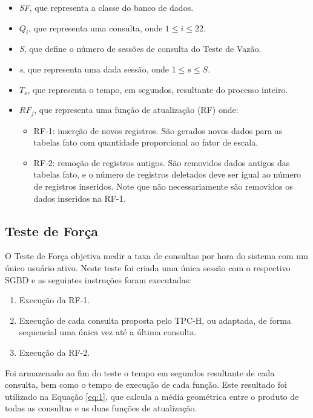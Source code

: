 \documentclass[conference]{IEEEtran}
\begin{document}
\begin{itemize}
	\item \textit{SF}, que representa a classe do banco de dados.
	\item \textit{$Q_{i}$}, que representa uma consulta, onde \mbox{$1 \le i \le 22$}.
	\item \textit{S}, que define o número de sessões de consulta do Teste de Vazão.
	\item \textit{s}, que representa uma dada sessão, onde \mbox{$1 \le s \le S$}.
	\item \textit{$T_{s}$}, que representa o tempo, em segundos, resultante do processo inteiro.
	\item \textit{$RF_{j}$}, que representa uma função de atualização (RF) onde:
		\begin{itemize}
		    \item RF-1: inserção de novos registros. São gerados novos dados para as tabelas fato com quantidade proporcional ao fator de escala. 
		    \item RF-2: remoção de registros antigos. São removidos dados antigos das tabelas fato, e o número de registros deletados deve ser igual ao número de registros inseridos. Note que não necessariamente são removidos os dados inseridos na RF-1.
		\end{itemize}
\end{itemize}

\subsection{Teste de Força}
\label{power_test}
O Teste de Força objetiva medir a taxa de consultas por hora do sistema com um único usuário ativo. Neste teste foi criada uma única sessão com o respectivo SGBD e as seguintes instruções foram executadas:

\begin{enumerate}
	\item Execução da RF-1.
	\item Execução de cada consulta proposta pelo TPC-H, ou adaptada, de forma sequencial uma única vez até a última consulta.
	\item Execução da RF-2.
\end{enumerate}

Foi armazenado ao fim do teste o tempo em segundos resultante de cada consulta, bem como o tempo de execução de cada função. Este resultado foi utilizado na Equação \ref{eq:1}, que calcula a média geométrica entre o produto de todas as consultas e as duas funções de atualização.
\end{document}
